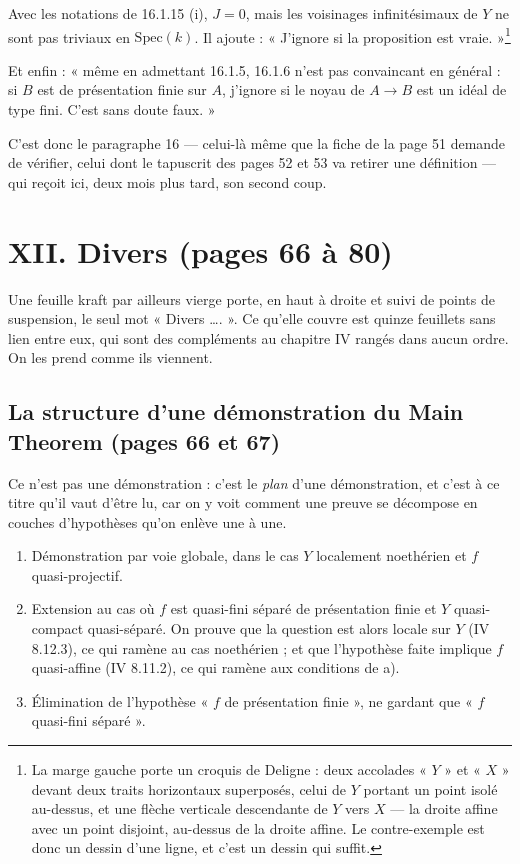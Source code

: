 \documentclass[11pt,a4paper]{article}
\begin{document}
Avec les notations de 16.1.15 (i), $J = 0$, mais les voisinages infinitésimaux
de $Y$ ne sont pas triviaux en $\mathrm{Spec}(k)$. Il ajoute : « J'ignore si la
proposition est vraie. »\footnote{La marge gauche porte un croquis de Deligne :
deux accolades « $Y$ » et « $X$ » devant deux traits horizontaux superposés,
celui de $Y$ portant un point isolé au-dessus, et une flèche verticale
descendante de $Y$ vers $X$ — la droite affine avec un point disjoint,
au-dessus de la droite affine. Le contre-exemple est donc un dessin d'une
ligne, et c'est un dessin qui suffit.}

Et enfin : « même en admettant 16.1.5, 16.1.6 n'est pas convaincant en général :
si $B$ est de présentation finie sur $A$, j'ignore si le noyau de $A \to B$ est
un idéal de type fini. C'est sans doute faux. »

C'est donc le paragraphe 16 — celui-là même que la fiche de la page 51 demande
de vérifier, celui dont le tapuscrit des pages 52 et 53 va retirer une
définition — qui reçoit ici, deux mois plus tard, son second coup.

\section*{XII. Divers (pages 66 à 80)}

Une feuille kraft par ailleurs vierge porte, en haut à droite et suivi de points
de suspension, le seul mot « Divers …. ». Ce qu'elle couvre est quinze feuillets
sans lien entre eux, qui sont des compléments au chapitre IV rangés dans aucun
ordre. On les prend comme ils viennent.

\subsection*{La structure d'une démonstration du Main Theorem (pages 66 et 67)}

Ce n'est pas une démonstration : c'est le \emph{plan} d'une démonstration, et
c'est à ce titre qu'il vaut d'être lu, car on y voit comment une preuve se
décompose en couches d'hypothèses qu'on enlève une à une.

\begin{enumerate}
  \item[a)] Démonstration par voie globale, dans le cas $Y$ localement
  noethérien et $f$ quasi-projectif.
  \item[b)] Extension au cas où $f$ est quasi-fini séparé de présentation finie
  et $Y$ quasi-compact quasi-séparé. On prouve que la question est alors locale
  sur $Y$ (IV 8.12.3), ce qui ramène au cas noethérien ; et que l'hypothèse
  faite implique $f$ quasi-affine (IV 8.11.2), ce qui ramène aux conditions de
  a).
  \item[c)] Élimination de l'hypothèse « $f$ de présentation finie », ne
  gardant que « $f$ quasi-fini séparé ».
\end{enumerate}
\end{document}
